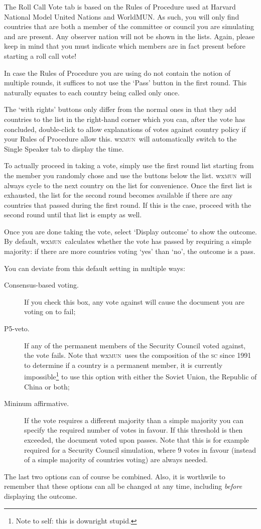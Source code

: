 \documentclass[11pt, a4paper]{article}
\newcommand\wxMUN{wx\textsc{mun}}
\begin{document}
The Roll Call Vote tab is based on the Rules of Procedure used at Harvard National Model United Nations and WorldMUN. As such, you will only find countries that are both a member of the committee or council you are simulating and are present. Any observer nation will not be shown in the lists. Again, please keep in mind that you must indicate which members are in fact present before starting a roll call vote!

In case the Rules of Procedure you are using do not contain the notion of multiple rounds, it suffices to not use the `Pass' button in the first round. This naturally equates to each country being called only once. 

The `with rights' buttons only differ from the normal ones in that they add countries to the list in the right-hand corner which you can, after the vote has concluded, double-click to allow explanations of votes against country policy if your Rules of Procedure allow this. \wxMUN\ will automatically switch to the Single Speaker tab to display the time.

To actually proceed in taking a vote, simply use the first round list starting from the member you randomly chose and use the buttons below the list. \wxMUN\ will always cycle to the next country on the list for convenience. Once the first list is exhausted, the list for the second round becomes available if there are any countries that passed during the first round. If this is the case, proceed with the second round until that list is empty as well.

Once you are done taking the vote, select `Display outcome' to show the outcome. By default, \wxMUN\ calculates whether the vote has passed by requiring a simple majority: if there are more countries voting `yes' than `no', the outcome is a pass.

You can deviate from this default setting in multiple ways:

\begin{description}
\item[Consensus-based voting.] If you check this box, any vote against will cause the document you are voting on to fail;
\item[P5-veto.] If any of the permanent members of the Security Council voted against, the vote fails. Note that \wxMUN\ uses the composition of the \textsc{sc} since 1991 to determine if a country is a permanent member, it is currently impossible\footnote{Note to self: this is downright stupid.} to use this option with either the Soviet Union, the Republic of China or both;
\item[Mininum affirmative.] If the vote requires a different majority than a simple majority you can specify the required number of votes in favour. If this threshold is then exceeded, the document voted upon passes. Note that this is for example required for a Security Council simulation, where 9 votes in favour (instead of a simple majority of countries voting) are always needed.
\end{description}
The last two options can of course be combined. Also, it is worthwile to remember that these options can all be changed at any time, including \emph{before} displaying the outcome.
\end{document}
